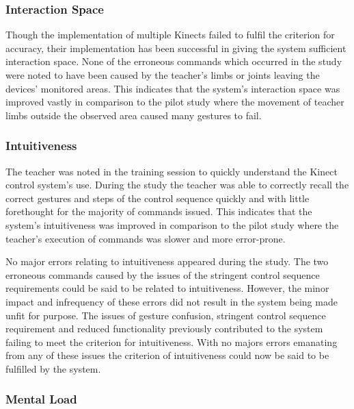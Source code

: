 \documentclass[link]{IWCOMP}
\begin{document}
\subsubsection{Interaction Space}
\label{subsubsec:discussionResolutionInteractionSpace}

Though the implementation of multiple Kinects failed to fulfil the criterion for accuracy, their implementation has been successful in giving the system sufficient interaction space.
None of the erroneous commands which occurred in the study were noted to have been caused by the teacher's limbs or joints leaving the devices' monitored areas.
This indicates that the system's interaction space was improved vastly in comparison to the pilot study where the movement of teacher limbs outside the observed area caused many gestures to fail.

\subsubsection{Intuitiveness}
\label{subsubsec:discussionResolutionIntuitiveness}

The teacher was noted in the training session to quickly understand the Kinect control system's use.
During the study the teacher was able to correctly recall the correct gestures and steps of the control sequence quickly and with little forethought for the majority of commands issued.
This indicates that the system's intuitiveness was improved in comparison to the pilot study where the teacher's execution of commands was slower and more error-prone.

No major errors relating to intuitiveness appeared during the study.
The two erroneous commands caused by the issues of the stringent control sequence requirements could be said to be related to intuitiveness.
However, the minor impact and infrequency of these errors did not result in the system being made unfit for purpose.
The issues of gesture confusion, stringent control sequence requirement and reduced functionality previously contributed to the system failing to meet the criterion for intuitiveness.
With no majors errors emanating from any of these issues the criterion of intuitiveness could now be said to be fulfilled by the system.

\subsubsection{Mental Load}
\label{subsubsec:discussionResolutionMentalLoad}
\end{document}
